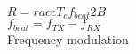 \documentclass[preview]{standalone}
\begin{document}
$R = rac{c T_{c} f_{beat}}{2 B}$\\$f_{beat} = f_{TX} - f_{RX}$\\Frequency modulation\\
\end{document}
